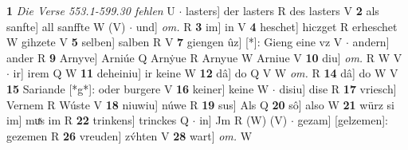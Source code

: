\documentclass[8pt,a4paper,notitlepage]{article}
\begin{document}
\begin{table}[ht]
\begin{minipage}[t]{0.5\linewidth}
\textbf{1} \textit{Die Verse 553.1-599.30 fehlen} U   $\cdot$ lasters] der lasters R des lasters V \textbf{2} als sanfte] all sanffte W (V)  $\cdot$ und] \textit{om.} R \textbf{3} im] in V \textbf{4} heschet] hiczget R erheschet W gihzete V \textbf{5} selben] salben R V \textbf{7} giengen ûz] [*]: Gieng eine vz V  $\cdot$ andern] ander R \textbf{9} Arnyve] Arniúe Q Arnẏue R Arnyue W Arniue V \textbf{10} diu] \textit{om.} R W V  $\cdot$ ir] irem Q W \textbf{11} deheiniu] ir keine W \textbf{12} dâ] do Q V W \textit{om.} R \textbf{14} dâ] do W V \textbf{15} Sariande [*g*]: oder burgere V \textbf{16} keiner] keine W  $\cdot$ disiu] dise R \textbf{17} vriesch] Vernem R Wúste V \textbf{18} niuwiu] núwe R \textbf{19} sus] Als Q \textbf{20} sô] also W \textbf{21} würz si im] muͯs im R \textbf{22} trinkens] trinckes Q  $\cdot$ in] Jm R (W) (V)  $\cdot$ gezam] [gelzemen]: gezemen R \textbf{26} vreuden] zv́hten V \textbf{28} wart] \textit{om.} W \newline
\end{minipage}
\end{table}
\end{document}

